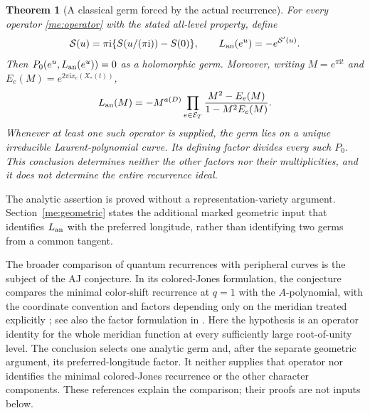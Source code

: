 \documentclass[11pt]{article}
\numberwithin{equation}{section}
\newtheorem{theorem}{Theorem}[section]
\theoremstyle{definition}\newtheorem{definition}[theorem]{Definition}
\newcommand{\ii}{\mathrm i}
\begin{document}
\begin{theorem}[A classical germ forced by the actual recurrence]
\label{me:symbol}
For every operator \eqref{me:operator} with the stated all-level
property, define
\[
 \mathcal S(u)=\pi\ii\{S(u/(\pi\ii))-S(0)\},\qquad
 L_{\rm an}(e^u)=-e^{\mathcal S'(u)}.
\]
Then $P_0(e^u,L_{\rm an}(e^u))=0$ as a holomorphic germ. Moreover,
writing $M=e^{\pi\ii t}$ and $E_e(M)=e^{2\pi\ii x_e(X_*(t))}$,
\begin{equation}\label{me:longitude-formula}
 L_{\rm an}(M)=-M^{a(D)}\prod_{e\in\mathcal E_T}
                          \frac{M^2-E_e(M)}{1-M^2E_e(M)}.
\end{equation}
Whenever at least one such operator is supplied, the germ lies on
a unique irreducible Laurent-polynomial curve. Its defining factor
divides every such $P_0$. This conclusion determines neither the
other factors nor their multiplicities, and it does not determine
the entire recurrence ideal.
\end{theorem}

The analytic assertion is proved without a representation-variety
argument. Section~\ref{me:geometric} states the additional marked
geometric input that identifies $L_{\rm an}$ with the preferred
longitude, rather than identifying two germs from a common tangent.

The broader comparison of quantum recurrences with peripheral curves
is the subject of the AJ conjecture. In its colored-Jones formulation,
the conjecture compares the minimal color-shift recurrence at $q=1$
with the $A$-polynomial, with the coordinate convention and factors
depending only on the meridian treated explicitly
\cite[Section 2.2, Conjecture 2]{AJ}; see also the factor formulation
in \cite[Section 1.1]{DiagrammaticAJ}. Here the hypothesis is an operator
identity for the whole meridian function at every sufficiently large
root-of-unity level. The conclusion selects one analytic germ and,
after the separate geometric argument, its preferred-longitude factor.
It neither supplies that operator nor identifies the minimal
colored-Jones recurrence or the other character components. These
references explain the comparison; their proofs are not inputs below.







\end{document}
